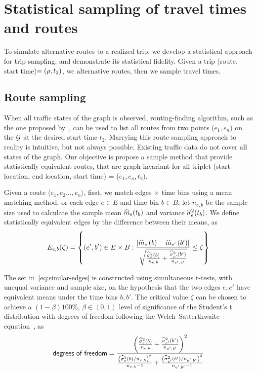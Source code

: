 \documentclass[12pt]{article}
\begin{document}
{{{{{{\section{Statistical sampling of travel times and routes}\label{sec:sampler}
To simulate alternative routes to a realized trip, we develop a statistical approach for trip sampling, and demonstrate its statistical fidelity. Given a trip (route, start time)$=(\rho, t_2)$, we alternative routes, then we sample travel times.
\subsection{Route sampling}\label{sec:route sampling}
When all traffic states of the graph is observed, routing-finding algorithm, such as the one proposed by~\cite{1970algorithm}, can be used to list all routes from two points ($e_1, e_n)$ on the $\mathcal{G}$ at the desired start time $t_2$. Marrying this route sampling approach to reality is intuitive, but not always possible. Existing traffic data do not cover all states of the graph.  Our objective is propose a sample method that provide statistically equivalent routes, that are graph-invariant for all triplet (start location, end location, start time) = ($e_1, e_n, t_2)$. 

Given a route $\langle e_1, e_2 \dots, e_n \rangle$, first, we match edges $\times$ time bins using a mean matching method. or each edge $e \in E$ and time bin $b \in B$, let $n_{e,b}$ be the sample size used to calculate the sample mean ${\widehat m}_e(t_b)$ and variance ${\widehat \sigma^2}_e(t_b)$. We define statistically equivalent edges by the difference between their means, as 
\begin{equation}\label{eq:similar-edges}
E_{e, b}(\zeta) =
\left\{
    \left(e', b'\right) \in E \times B:
    {\frac
    {\left|{\widehat m}_e\left(b\right) - {\widehat m}_{e'}\left(b'\right)\right|}
    {\sqrt{\frac
        {{\widehat \sigma^2}_e(b)}
        {n_{e,b}} 
        +
        \frac
        {{\widehat \sigma^2}_{e'}(b')}
        {n_{e',b'} }
    }} \leq \zeta
    }
    \right\} 
\end{equation}

The set in~\eqref{eq:similar-edges} is constructed using simultaneous t-tests, with unequal variance and sample size, on the hypothesis that the two edges $e, e'$ have equivalent means under the time bins $b, b'$. The critical value $\zeta$ can be chosen to achieve a $(1-\beta)100\%$, $\beta \in (0, 1)$ level of significance of the Student's t distribution with  degrees of freedom following the Welch–Satterthwaite equation~\citep{satterthwaite1946approximate,welch1947generalization}, as
\[
\textsf{degrees of freedom} = 
\frac{
\left({\frac
        {{\widehat \sigma^2}_e(b)}
        {n_{e,b}} +
    \frac
        {{\widehat \sigma^2}_{e'}(b')}
        {n_{e',b'} }
    }\right)^2
}{
 \frac{\left({\widehat \sigma^2}_e(b)/ n_{e,b}\right)^2}{ n_{e,b}-1} 
 + 
  \frac{\left({\widehat \sigma^2}_{e'}(b')/ n_{e',b'}\right)^2}{ n_{e',b'}-1}
}
\]

}}}}}}
\end{document}

